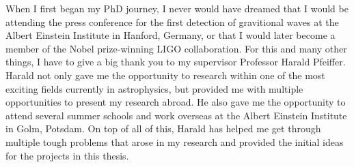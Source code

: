 \begin{preliminary}
\begin{abstract}
\end{abstract}
\cleardoublepage






\cleardoublepage

\begin{acknowledgements}

When I first began my PhD journey, I never would have dreamed that I would be attending the press conference for the first detection of gravitional waves at the Albert Einstein Institute in Hanford, Germany, or that I would later become a member of the Nobel prize-winning LIGO collaboration. For this and many other things, I have to give a big thank you to my supervisor Professor Harald Pfeiffer. Harald not only gave me the opportunity to research within one of the most exciting fields currently in astrophysics, but provided me with multiple opportunities to present my research abroad. He also gave me the opportunity to attend several summer schools and work overseas at the Albert Einstein Institute in Golm, Potsdam. On top of all of this, Harald has helped me get through multiple tough problems that arose in my research and provided the initial ideas for the projects in this thesis.
 

\end{acknowledgements}
\end{preliminary}
